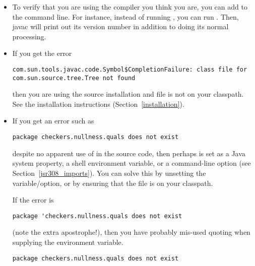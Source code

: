 \begin{itemize}

\item
To verify that you are using the compiler you think you are, you can add
 to the command line.  For instance, instead of running
, you can run .  Then, javac will print out its version number in addition
to doing its normal processing.


\item
If you get the error

\begin{smaller}
\begin{Verbatim}
com.sun.tools.javac.code.Symbol$CompletionFailure: class file for com.sun.source.tree.Tree not found
\end{Verbatim}
\end{smaller}

\noindent
then you are using the source installation and file  is not
on your classpath.  See the installation instructions
(Section~\ref{installation}).


\item
If you get an error such as

\begin{Verbatim}
package checkers.nullness.quals does not exist
\end{Verbatim}

  \noindent
  despite no apparent use of  in
  the source code, then perhaps
   is set as a Java system property, a shell
  environment variable, or a command-line option (see
  Section~\ref{jsr308_imports}).  You can solve this by unsetting the
  variable/option, or by ensuring that the  file is on
  your classpath.

If the error is 

\begin{Verbatim}
package 'checkers.nullness.quals does not exist
\end{Verbatim}

\noindent
(note the extra apostrophe!), then you have probably mis-used quoting when
supplying the  environment variable.

\begin{Verbatim}
package checkers.nullness.quals does not exist
\end{Verbatim}



\end{itemize}
